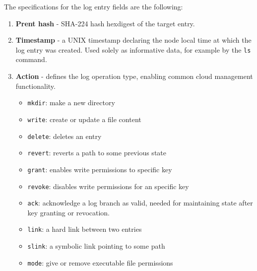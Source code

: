 \documentclass{sig-alternate}
\begin{document}
The specifications for the log entry fields are the following:

\begin{enumerate}
\item \textbf{Prent hash} - SHA-224 hash hexdigest of the target entry.
\item \textbf{Timestamp} - a UNIX timestamp declaring the node local time at which the log entry was created. Used solely as informative data, for example by the \texttt{ls} command.
\item \textbf{Action} - defines the log operation type, enabling common cloud management functionality.
    \begin{itemize}
    \item \texttt{mkdir}: make a new directory
    \item \texttt{write}: create or update a file content
    \item \texttt{delete}: deletes an entry
    \item \texttt{revert}: reverts a path to some previous state
    \item \texttt{grant}: enables write permissions to specific key
    \item \texttt{revoke}: disables write permissions for an specific key
    \item \texttt{ack}: acknowledge a log branch as valid, needed for maintaining state after key granting or revocation.
    \item \texttt{link}: a hard link between two entries
    \item \texttt{slink}: a symbolic link pointing to some path
    \item \texttt{mode}: give or remove executable file permissions
    \end{itemize}


\end{enumerate}
\end{document}
